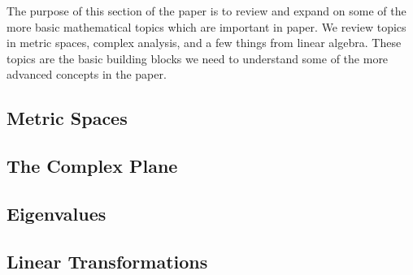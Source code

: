 The purpose of this section of the paper is to review and expand on some of the more basic mathematical topics which are important in \authorsetals paper.  We review topics in metric spaces, complex analysis, and a few things from linear algebra.  These topics are the basic building blocks we need to understand some of the more advanced concepts in the paper.

\subsection{Metric Spaces}

\newpage
\subsection{The Complex Plane}

\newpage
\subsection{Eigenvalues}

\newpage
\subsection{Linear Transformations}
